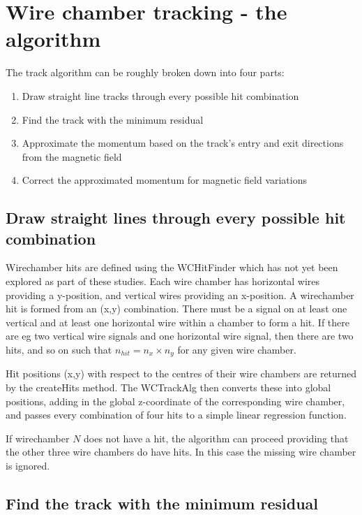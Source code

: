 \section{Wire chamber tracking - the algorithm}

The track algorithm can be roughly broken down into four parts:
\begin{enumerate}
\item Draw straight line tracks through every possible hit combination
\item Find the track with the minimum residual
\item Approximate the momentum based on the track's entry and exit directions from the magnetic field
\item Correct the approximated momentum for magnetic field variations
\end{enumerate}

\subsection{Draw straight lines through every possible hit combination}

Wirechamber hits are defined using the WCHitFinder which has not yet been explored as part of these studies. Each wire chamber has horizontal wires providing a y-position, and vertical wires providing an x-position. A wirechamber hit is formed from an (x,y) combination. There must be a signal on at least one vertical and at least one horizontal wire within a chamber to form a hit. If there are eg two vertical wire signals and one horizontal wire signal, then there are two hits, and so on such that $n_{hit} = n_{x} \times n_{y}$ for any given wire chamber.

Hit positions (x,y) with respect to the centres of their wire chambers are returned by the createHits method. The WCTrackAlg then converts these into global positions, adding in the global z-coordinate of the corresponding wire chamber, and passes every combination of four hits to a simple linear regression function.

If wirechamber $N$ does not have a hit, the algorithm can proceed providing that the other three wire chambers do have hits. In this case the missing wire chamber is ignored.

\subsection{Find the track with the minimum residual}\label{sec_residual}

